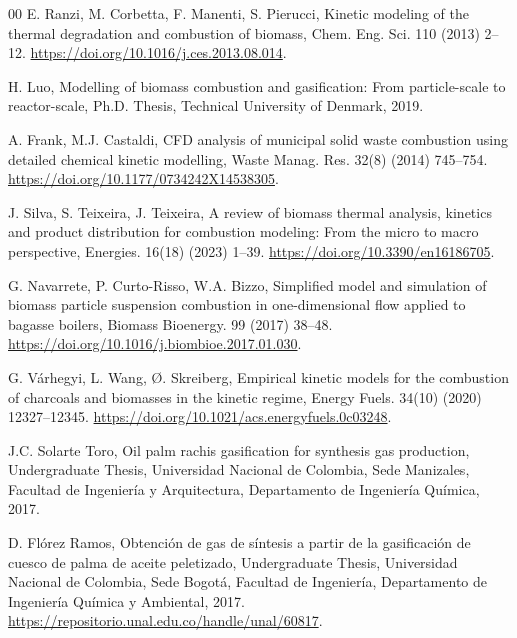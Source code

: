 \documentclass[preprint,12pt]{elsarticle}
\begin{document}
{\begin{thebibliography}{00}
 E. Ranzi, M. Corbetta, F. Manenti, S. Pierucci, Kinetic modeling of the thermal degradation and combustion of biomass, Chem. Eng. Sci. 110 (2013) 2–12. \href{https://doi.org/10.1016/j.ces.2013.08.014}{https://doi.org/10.1016/j.ces.2013.08.014}.



 H. Luo, Modelling of biomass combustion and gasification: From particle-scale to reactor-scale, Ph.D. Thesis, Technical University of Denmark, 2019.




 A. Frank, M.J. Castaldi, CFD analysis of municipal solid waste combustion using detailed chemical kinetic modelling, Waste Manag. Res. 32(8) (2014) 745–754. \href{https://doi.org/10.1177/0734242X14538305}{https://doi.org/10.1177/0734242X14538305}.


 J. Silva, S. Teixeira, J. Teixeira, A review of biomass thermal analysis, kinetics and product distribution for combustion modeling: From the micro to macro perspective, Energies. 16(18) (2023) 1--39. \href{https://doi.org/10.3390/en16186705}{https://doi.org/10.3390/en16186705}.


 G. Navarrete, P. Curto-Risso, W.A. Bizzo, Simplified model and simulation of biomass particle suspension combustion in one-dimensional flow applied to bagasse boilers, Biomass Bioenergy. 99 (2017) 38--48. \href{https://doi.org/10.1016/j.biombioe.2017.01.030}{https://doi.org/10.1016/j.biombioe.2017.01.030}.

 G. Várhegyi, L. Wang, Ø. Skreiberg, Empirical kinetic models for the combustion of charcoals and biomasses in the kinetic regime, Energy Fuels. 34(10) (2020) 12327--12345. \href{https://doi.org/10.1021/acs.energyfuels.0c03248}{https://doi.org/10.1021/acs.energyfuels.0c03248}.




 J.C. Solarte Toro, Oil palm rachis gasification for synthesis gas production, Undergraduate Thesis, Universidad Nacional de Colombia, Sede Manizales, Facultad de Ingeniería y Arquitectura, Departamento de Ingeniería Química, 2017.





 D. Flórez Ramos, Obtención de gas de síntesis a partir de la gasificación de cuesco de palma de aceite peletizado, Undergraduate Thesis, Universidad Nacional de Colombia, Sede Bogotá, Facultad de Ingeniería, Departamento de Ingeniería Química y Ambiental, 2017. \href{https://repositorio.unal.edu.co/handle/unal/60817}{https://repositorio.unal.edu.co/handle/unal/60817}.




\end{thebibliography}}
\end{document}

